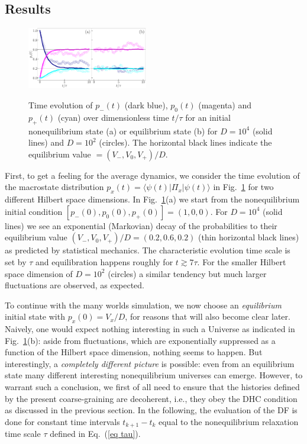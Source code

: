 \documentclass[pre,onecolumn,12pt,aps,longbibliography,nofootinbib]{revtex4-2}
\newcommand{\lr}[1]{{\langle {#1}\rangle}}
\newcommand{\blue}[1]{#1}
\newcommand{\new}[1]{#1}
\begin{document}
\subsection{Results}

\begin{figure}[tb]
 \centering\includegraphics[width=0.47\textwidth,clip=true]{dynamics.pdf}
 \label{fig dynamics}
 \caption{Time evolution of $p_-(t)$ (dark blue), $p_0(t)$ (magenta) and $p_+(t)$ (cyan) over dimensionless time
 $t/\tau$ for an initial nonequilibrium state (a) or equilibrium state (b) for $D=10^4$ (solid lines) and $D=10^2$ (circles). The horizontal black lines indicate the equilibrium value $= (V_-,V_0,V_+)/D$.  }
\end{figure}

First, to get a feeling for the average dynamics, we consider the time evolution of \new{the macrostate distribution $p_x(t) = \lr{\psi(t)|\Pi_x|\psi(t)}$} in Fig.~\ref{fig dynamics} \new{for two different Hilbert space dimensions. In Fig.~\ref{fig dynamics}(a) we start from the nonequilibrium initial condition $[p_-(0),p_0(0),p_+(0)] = (1,0,0)$. For $D=10^4$ (solid lines)} we see an exponential (Markovian) decay of the probabilities to their equilibrium value $(V_-,V_0,V_+)/D = (0.2,0.6,0.2)$ (thin horizontal black lines) as predicted by statistical mechanics. The characteristic evolution time scale is set by $\tau$ and equilibration happens roughly for $t\gtrsim7\tau$. \new{For the smaller Hilbert space dimension of $D=10^2$ (circles) a similar tendency but much larger fluctuations are observed, as expected.}

To continue with the many worlds simulation, we now choose an \emph{equilibrium} initial state with $p_x(0) = V_x/D$, for reasons that will also become clear \blue{later}. Naively, one would expect nothing interesting in such a Universe as indicated in Fig.~\ref{fig dynamics}(b): aside from fluctuations, \new{which are exponentially suppressed as a function of the Hilbert space dimension}, nothing seems to happen. But interestingly, a \emph{completely different picture} is possible: even from an equilibrium state many different interesting nonequilibrium universes \new{can} emerge. However, to warrant such a conclusion, we first of all need to ensure that the histories defined by the present coarse-graining are \new{decoherent}, i.e., they obey the DHC condition as discussed in the previous section. In the following, the evaluation of the DF is done for constant time intervals $t_{k+1}-t_k$ equal to the nonequilibrium relaxation time scale $\tau$ defined in Eq.~(\ref{eq tau}).
\end{document}
